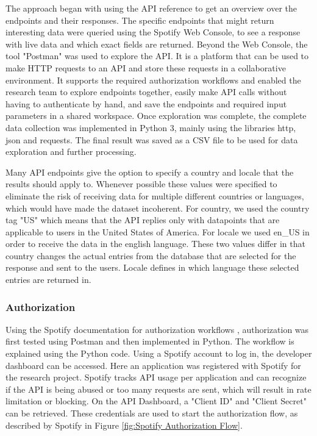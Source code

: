 The approach began with using the \ac{API} reference to get an overview over the endpoints and their responses.
The specific endpoints that might return interesting data were queried using the Spotify Web Console, to see
a response with live data and which exact fields are returned.
Beyond the Web Console, the tool "Postman" was used to explore the \ac{API}.
It is a platform that can be used to make HTTP requests to an API and store these requests in
a collaborative environment. \cite{PostmanWhatIs} It supports the required authorization workflows
and enabled the research team to explore endpoints together, easily make \ac{API} calls without having to
authenticate by hand, and save the endpoints and required input parameters in a shared workspace.
Once exploration was complete, the complete data collection was implemented in Python 3, mainly using the
libraries http, json and requests. The final result was saved as a CSV file to be used for data exploration
and further processing.

Many API endpoints give the option to specify a country and locale that the results should apply to.
Whenever possible these values were specified to eliminate the risk of receiving data for multiple different
countries or languages, which would have made the dataset incoherent.
For country, we used the country tag "US" which means that the API replies only with datapoints that are applicable
to users in the United States of America.
For locale we used en\_US in order to receive the data in the english language.
These two values differ in that country changes the actual entries from the database that are selected for the response
and sent to the users. Locale defines in which language these selected entries are returned in.

\subsubsection{Authorization}

Using the Spotify documentation for authorization workflows \cite{SpotifyAuth}, authorization was first tested
using Postman and then implemented in Python.
The workflow is explained using the Python code.
Using a Spotify account to log in, the developer dashboard can be accessed. Here an application was registered with
Spotify for the research project. Spotify tracks \ac{API} usage per application and can recognize if the API is
being abused or too many requests are sent, which will result in rate limitation or blocking.
On the API Dashboard, a "Client ID" and "Client Secret" can be retrieved. These credentials are used to start
the authorization flow, as described by Spotify in Figure \ref{fig:Spotify Authorization Flow}.

